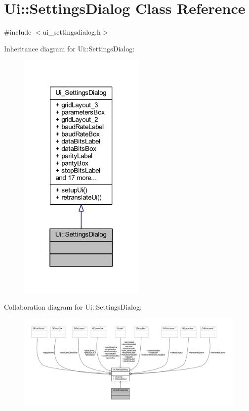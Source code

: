 \hypertarget{a00076}{\section{Ui\+:\+:Settings\+Dialog Class Reference}
\label{a00076}
}


{\ttfamily \#include $<$ui\+\_\+settingsdialog.\+h$>$}



Inheritance diagram for Ui\+:\+:Settings\+Dialog\+:
\nopagebreak
\begin{figure}[H]
\begin{center}
\leavevmode
\includegraphics[width=175pt]{da/d6e/a00610}
\end{center}
\end{figure}


Collaboration diagram for Ui\+:\+:Settings\+Dialog\+:
\nopagebreak
\begin{figure}[H]
\begin{center}
\leavevmode
\includegraphics[width=350pt]{dd/dc0/a00611}
\end{center}
\end{figure}
